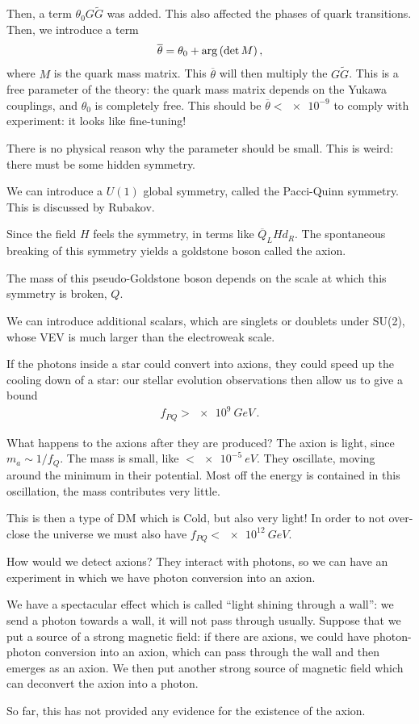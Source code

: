 \documentclass[main.tex]{subfiles}
\begin{document}
Then, a term \(\theta_0   G \widetilde{G}\) was added. 
This also affected the phases of quark transitions. 
Then, we introduce a term 
%
\begin{align}
\overline{\theta} = \theta_0  + \arg \qty(\det M)
\,,
\end{align}
%
where \(M\) is the quark mass matrix. This \(\overline{\theta}\) will then multiply the \(G \widetilde{G}\). This is a free parameter of the theory: the quark mass matrix depends on the Yukawa couplings, and \(\theta_0 \) is completely free.
This should be \(\overline{\theta} < \num{e-9}\) to comply with experiment: it looks like fine-tuning!

There is no physical reason why the parameter should be small.
This is weird: there must be some hidden symmetry.

We can introduce a \(U(1)\) global symmetry, called the Pacci-Quinn symmetry. 
This is discussed by Rubakov.

Since the field \(H\) feels the symmetry, in terms like \(\overline{Q}_{L} H d_R\). 
The spontaneous breaking of this symmetry yields a goldstone boson called the axion. 

The mass of this pseudo-Goldstone boson depends on the scale at which this symmetry is broken, \(Q\). 


We can introduce additional scalars, which are singlets or doublets under SU(2), whose VEV is much larger than the electroweak scale.

If the photons inside a star could convert into axions, they could speed up the cooling down of a star: our stellar evolution observations then allow us to give a bound
%
\begin{align}
f_{PQ} > \SI{e9}{GeV}
\,.
\end{align}

What happens to the axions after they are produced? The axion is light, since \(m_a \sim 1 / f_Q\). The mass is small, like \(< \SI{e-5}{eV}\).
They oscillate, moving around the minimum in their potential.
Most off the energy is contained in this oscillation, the mass contributes very little. 

This is then a type of DM which is Cold, but also very light!
In order to not over-close the universe we must also have \(f_{PQ} < \SI{e12}{GeV}\).

How would we detect axions? They interact with photons, so we can have an experiment in which we have photon conversion into an axion.

We have a spectacular effect which is called ``light shining through a wall'': we send a photon towards a wall, it will not pass through usually. 
Suppose that we put a source of a strong magnetic field: if there are axions, we could have photon-photon conversion into an axion, which can pass through the wall and then emerges as an axion. We then put another strong source of magnetic field which can deconvert the axion into a photon.

So far, this has not provided any evidence for the existence of the axion.
\end{document}
